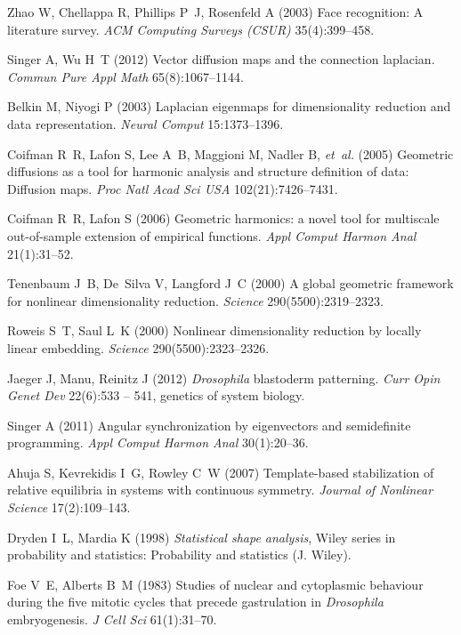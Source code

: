 \documentclass{pnastwo}
\begin{document}
\begin{article}
\begin{thebibliography}{10}
Zhao W, Chellappa R, Phillips P~J, Rosenfeld A (2003) Face recognition: A
  literature survey. \textit{ACM Computing Surveys (CSUR)} 35(4):399--458.

Singer A, Wu H~T (2012) Vector diffusion maps and the connection laplacian.
  \textit{Commun Pure Appl Math} 65(8):1067--1144.

Belkin M, Niyogi P (2003) Laplacian eigenmaps for dimensionality reduction and
  data representation. \textit{Neural Comput} 15:1373--1396.

Coifman R~R, Lafon S, Lee A~B, Maggioni M, Nadler B, \textit{et~al.} (2005)
  Geometric diffusions as a tool for harmonic analysis and structure definition
  of data: Diffusion maps. \textit{Proc Natl Acad Sci USA} 102(21):7426--7431.

Coifman R~R, Lafon S (2006) Geometric harmonics: a novel tool for multiscale
  out-of-sample extension of empirical functions. \textit{Appl Comput Harmon Anal} 21(1):31--52.

Tenenbaum J~B, De~Silva V, Langford J~C (2000) A global geometric framework for
  nonlinear dimensionality reduction. \textit{Science} 290(5500):2319--2323.

Roweis S~T, Saul L~K (2000) Nonlinear dimensionality reduction by locally
  linear embedding. \textit{Science} 290(5500):2323--2326.

Jaeger J, Manu, Reinitz J (2012) \textit{{D}rosophila} blastoderm patterning.
  \textit{Curr Opin Genet Dev} 22(6):533 -- 541, genetics of system biology.

Singer A (2011) Angular synchronization by eigenvectors and semidefinite
  programming. \textit{Appl Comput Harmon Anal}
  30(1):20--36.

Ahuja S, Kevrekidis I~G, Rowley C~W (2007) Template-based stabilization of
  relative equilibria in systems with continuous symmetry. \textit{Journal of
  Nonlinear Science} 17(2):109--143.

Dryden I~L, Mardia K (1998) \textit{Statistical shape analysis}, Wiley series
  in probability and statistics: Probability and statistics (J. Wiley).

Foe V~E, Alberts B~M (1983) Studies of nuclear and cytoplasmic behaviour during
  the five mitotic cycles that precede gastrulation in \textit{{D}rosophila}
  embryogenesis. \textit{J Cell Sci} 61(1):31--70.


\end{thebibliography}
\end{article}
\end{document}
